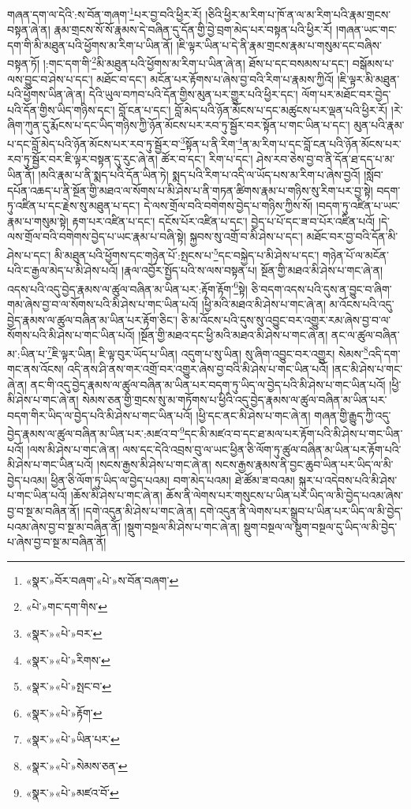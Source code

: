 གཞན་དག་ལ་དེའི་:ས་བོན་གཞག་\footnote{«སྣར་»བོར་བཞག་«པེ་»ས་བོན་བཞག་}པར་བྱ་བའི་ཕྱིར་རོ། །ཅིའི་ཕྱིར་མ་རིག་པ་ཁོ་ན་ལ་མ་རིག་པའི་རྣམ་གྲངས་བསྟན་ཞེ་ན། རྣམ་གྲངས་སོ་སོ་རྣམས་དེ་བཞིན་དུ་དོན་གྱི་བྱེ་བྲག་མེད་པར་བསྟན་པའི་ཕྱིར་རོ། །གཞན་ཡང་གང་དག་གི་མི་མཐུན་པའི་ཕྱོགས་མ་རིག་པ་ཡིན་ནོ། །ཇི་ལྟར་ཡིན་པ་དེ་ནི་རྣམ་གྲངས་རྣམ་པ་གསུམ་དང་བཞིས་བསྟན་ཏོ། །:གང་དག་གི་\footnote{«པེ་»གང་དག་གིས་}མི་མཐུན་པའི་ཕྱོགས་མ་རིག་པ་ཡིན་ཞེ་ན། ཐོས་པ་དང་བསམས་པ་དང་། བསྒོམས་པ་ལས་བྱུང་བ་ཤེས་པ་དང་། མཐོང་བ་དང་། མངོན་པར་རྟོགས་པ་ཞེས་བྱ་བའི་རིག་པ་རྣམས་ཀྱིའོ། །ཇི་ལྟར་མི་མཐུན་པའི་ཕྱོགས་ཡིན་ཞེ་ན། དེའི་ཡུལ་བཀབ་པའི་དོན་གྱིས་མུན་པར་གྱུར་པའི་ཕྱིར་དང་། ལོག་པར་མཐོང་བར་བྱེད་པའི་དོན་གྱིས་ཡིད་གཉིས་དང་། བློ་ངན་པ་དང་། བློ་མེད་པའི་ཉོན་མོངས་པ་དང་མཚུངས་པར་ལྡན་པའི་ཕྱིར་རོ། །རེ་ཞིག་ཀུན་དུ་རྨོངས་པ་དང་ཡིད་གཉིས་ཀྱི་ཉོན་མོངས་པར་རབ་ཏུ་སྦྱོར་བར་སྟོན་པ་གང་ཡིན་པ་དང་། མུན་པའི་རྣམ་པ་དང་བློ་མེད་པའི་ཉོན་མོངས་པར་རབ་ཏུ་སྦྱོར་བ་\footnote{«སྣར་»«པེ་»བར་}སྟོན་པ་ནི་རིག་\footnote{«སྣར་»«པེ་»རིགས་}ན་མ་རིག་པ་དང་བློ་ངན་པའི་ཉོན་མོངས་པར་རབ་ཏུ་སྦྱོར་བར་ཇི་ལྟར་བསྟན་དུ་རུང་ཞེ་ན། ཚོར་བ་དང་། རིག་པ་དང་། ཤེས་རབ་ཅེས་བྱ་བ་ནི་དོན་ཐ་དད་པ་མ་ཡིན་ནོ། །མའི་རྣམ་པ་ནི་སྨད་པའི་དོན་ཡིན་ཏེ། སྨད་པའི་རིག་པ་འདི་ལ་ཡོད་པས་མ་རིག་པ་ཞེས་བྱའོ། །སློབ་དཔོན་འཆད་པ་ནི་སྔོན་གྱི་མཐའ་ལ་སོགས་པ་མི་ཤེས་པ་ནི་གཏན་ཚིགས་རྣམ་པ་གཉིས་སུ་རིག་པར་བྱ་སྟེ། བདག་ཏུ་འཛིན་པ་དང་རྗེས་སུ་མཐུན་པ་དང་། དེ་ལས་གྲོལ་བའི་བགེགས་བྱེད་པ་གཉིས་ཀྱིས་སོ། །བདག་ཏུ་འཛིན་པ་ཡང་རྣམ་པ་གསུམ་སྟེ། རྟག་པར་འཛིན་པ་དང་། དངོས་པོར་འཛིན་པ་དང་། བྱེད་པ་པོ་དང་ཟ་བ་པོར་འཛིན་པའོ། །དེ་ལས་གྲོལ་བའི་བགེགས་བྱེད་པ་ཡང་རྣམ་པ་བཞི་སྟེ། སྐྱབས་སུ་འགྲོ་བ་མི་ཤེས་པ་དང་། མཐོང་བར་བྱ་བའི་དོན་མི་ཤེས་པ་དང་། མི་མཐུན་པའི་ཕྱོགས་དང་གཉེན་པོ་:སྤངས་པ་\footnote{«སྣར་»«པེ་»སྤང་བ་}དང་བསྐྱེད་པ་མི་ཤེས་པ་དང་། གཉེན་པོ་ལ་མངོན་པའི་ང་རྒྱལ་མེད་པ་མི་ཤེས་པའོ། །རྣལ་འབྱོར་སྤྱོད་པའི་ས་ལས་བསྟན་པ། སྔོན་གྱི་མཐའ་མི་ཤེས་པ་གང་ཞེ་ན། འདས་པའི་འདུ་བྱེད་རྣམས་ལ་ཚུལ་བཞིན་མ་ཡིན་པར་:རྟོག་རྟོག་\footnote{«སྣར་»«པེ་»རྟོག་}སྟེ། ཅི་བདག་འདས་པའི་དུས་ན་བྱུང་བ་ཞིག་གམ་ཞེས་བྱ་བ་ལ་སོགས་པའི་མི་ཤེས་པ་གང་ཡིན་པའོ། །ཕྱི་མའི་མཐའ་མི་ཤེས་པ་གང་ཞེ་ན། མ་འོངས་པའི་འདུ་བྱེད་རྣམས་ལ་ཚུལ་བཞིན་མ་ཡིན་པར་རྟོག་ཅིང་། ཅི་མ་འོངས་པའི་དུས་སུ་འབྱུང་བར་འགྱུར་རམ་ཞེས་བྱ་བ་ལ་སོགས་པའི་མི་ཤེས་པ་གང་ཡིན་པའོ། །སྔོན་གྱི་མཐའ་དང་ཕྱི་མའི་མཐའ་མི་ཤེས་པ་གང་ཞེ་ན། ནང་ལ་ཚུལ་བཞིན་མ་:ཡིན་པ་\footnote{«སྣར་»«པེ་»ཡིན་པར་}ཇི་ལྟར་ཡིན། ཇི་ལྟ་བུར་ཡོད་པ་ཡིན། འདུག་པ་སུ་ཡིན། སུ་ཞིག་འབྱུང་བར་འགྱུར། སེམས་\footnote{«སྣར་»«པེ་»སེམས་ཅན་}འདི་དག་གང་ནས་འོངས། འདི་ནས་ཤི་ནས་གར་འགྲོ་བར་འགྱུར་ཞེས་བྱ་བའི་མི་ཤེས་པ་གང་ཡིན་པའོ། །ནང་མི་ཤེས་པ་གང་ཞེ་ན། ནང་གི་འདུ་བྱེད་རྣམས་ལ་ཚུལ་བཞིན་མ་ཡིན་པར་བདག་ཏུ་ཡིད་ལ་བྱེད་པའི་མི་ཤེས་པ་གང་ཡིན་པའོ། །ཕྱི་མི་ཤེས་པ་གང་ཞེ་ན། སེམས་ཅན་གྱི་གྲངས་སུ་མ་གཏོགས་པ་ཕྱིའི་འདུ་བྱེད་རྣམས་ལ་ཚུལ་བཞིན་མ་ཡིན་པར་བདག་གིར་ཡིད་ལ་བྱེད་པའི་མི་ཤེས་པ་གང་ཡིན་པའོ། །ཕྱི་དང་ནང་མི་ཤེས་པ་གང་ཞེ་ན། གཞན་གྱི་རྒྱུད་ཀྱི་འདུ་བྱེད་རྣམས་ལ་ཚུལ་བཞིན་མ་ཡིན་པར་:མཛའ་བ་\footnote{«སྣར་»«པེ་»མཛའ་བོ་}དང་མི་མཛའ་བ་དང་ཐ་མལ་པར་རྟོག་པའི་མི་ཤེས་པ་གང་ཡིན་པའོ། །ལས་མི་ཤེས་པ་གང་ཞེ་ན། ལས་དང་དེའི་འབྲས་བུ་ལ་ཡང་ཕྱིན་ཅི་ལོག་ཏུ་ཚུལ་བཞིན་མ་ཡིན་པར་རྟོག་པའི་མི་ཤེས་པ་གང་ཡིན་པའོ། །སངས་རྒྱས་མི་ཤེས་པ་གང་ཞེ་ན། སངས་རྒྱས་རྣམས་ནི་བྱང་ཆུབ་ཡིན་པར་ཡིད་ལ་མི་བྱེད་པའམ། ཕྱིན་ཅི་ལོག་ཏུ་ཡིད་ལ་བྱེད་པའམ། བག་མེད་པའམ། ཐེ་ཚོམ་ཟ་བའམ། སྐུར་པ་འདེབས་པའི་མི་ཤེས་པ་གང་ཡིན་པའོ། །ཆོས་མི་ཤེས་པ་གང་ཞེ་ན། ཆོས་ནི་ལེགས་པར་གསུངས་པ་ཡིན་པར་ཡིད་ལ་མི་བྱེད་པའམ་ཞེས་བྱ་བ་སྔ་མ་བཞིན་ནོ། །དགེ་འདུན་མི་ཤེས་པ་གང་ཞེ་ན། དགེ་འདུན་ནི་ལེགས་པར་སྒྲུབ་པ་ཡིན་པར་ཡིད་ལ་མི་བྱེད་པའམ་ཞེས་བྱ་བ་སྔ་མ་བཞིན་ནོ། །སྡུག་བསྔལ་མི་ཤེས་པ་གང་ཞེ་ན། སྡུག་བསྔལ་ལ་སྡུག་བསྔལ་དུ་ཡིད་ལ་མི་བྱེད་པ་ཞེས་བྱ་བ་སྔ་མ་བཞིན་ནོ། 